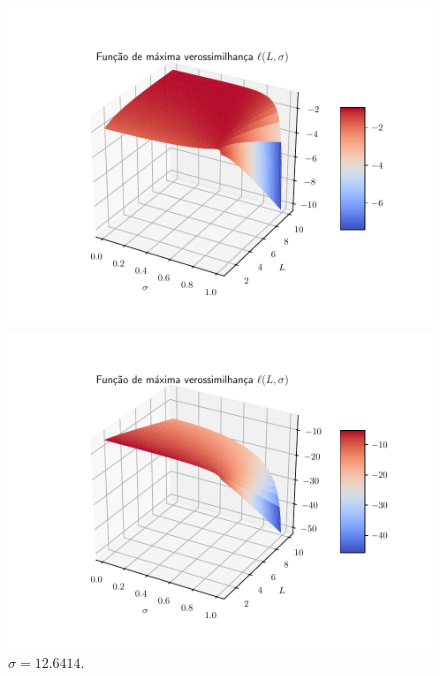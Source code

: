 \documentclass[journal,article,submit,moreauthors,pdftex]{Definitions/mdpi}
\begin{document}
\begin{figure}[hbt]
		\caption{$\sigma=2.1029 $.}\label{cap_acf_fig05}
\endminipage\hfill
\centering
{}
  \includegraphics[width=\linewidth]{funv_max_ver_j_30_flev_razao.pdf}
  	\caption{$\sigma=1.4999 $.}\label{cap_acf_fig04}
\endminipage\hfill
{}
  \includegraphics[width=\linewidth]{funv_max_ver_j_40_flev_razao.pdf}
		\caption{$\sigma=12.6414 $.}\label{cap_acf_fig05}
\endminipage\hfill
\end{figure}
\end{document}
